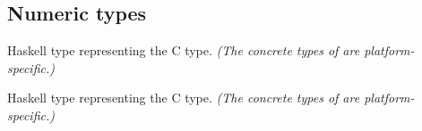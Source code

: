 \subsection{Numeric types}
\begin{haddockdesc}
\item[\begin{tabular}{@{}l}
data CClock
\end{tabular}]
{\haddockbegindoc
Haskell type representing the C  type.
 \emph{(The concrete types of  are platform-specific.)}\par}
\end{haddockdesc}
\begin{haddockdesc}
\item[\begin{tabular}{@{}l}
instance Enum CClock\\instance Storable CClock\\instance Num CClock\\instance Read CClock\\instance Real CClock\\instance Show CClock\\instance Eq CClock\\instance Ord CClock
\end{tabular}]
\end{haddockdesc}
\begin{haddockdesc}
\item[\begin{tabular}{@{}l}
data CTime
\end{tabular}]
{\haddockbegindoc
Haskell type representing the C  type.
 \emph{(The concrete types of  are platform-specific.)}\par}
\end{haddockdesc}
\begin{haddockdesc}
\item[\begin{tabular}{@{}l}
instance Enum CTime\\instance Storable CTime\\instance Num CTime\\instance Read CTime\\instance Real CTime\\instance Show CTime\\instance Eq CTime\\instance Ord CTime
\end{tabular}]
\end{haddockdesc}

